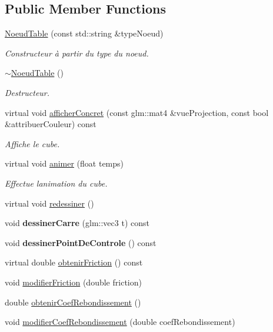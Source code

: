 \subsection*{Public Member Functions}
\begin{DoxyCompactItemize}
\item 
\hyperlink{group__inf2990_ga40983870720b331d17daeeb306e12ef5}{Noeud\+Table} (const std\+::string \&type\+Noeud)
\begin{DoxyCompactList}\small\item\em Constructeur à partir du type du noeud. \end{DoxyCompactList}\item 
\hyperlink{group__inf2990_ga6171c2df59de6f454f0d8c7915403ce7}{$\sim$\+Noeud\+Table} ()
\begin{DoxyCompactList}\small\item\em Destructeur. \end{DoxyCompactList}\item 
virtual void \hyperlink{group__inf2990_ga7e6bc962988899cf4ff7f2b1f9b51be9}{afficher\+Concret} (const glm\+::mat4 \&vue\+Projection, const bool \&attribuer\+Couleur) const
\begin{DoxyCompactList}\small\item\em Affiche le cube. \end{DoxyCompactList}\item 
virtual void \hyperlink{group__inf2990_gadf419e5147546815052d75529c4c45ab}{animer} (float temps)
\begin{DoxyCompactList}\small\item\em Effectue l\textquotesingle{}animation du cube. \end{DoxyCompactList}\item 
virtual void \hyperlink{group__inf2990_ga52e75d8d0ea0ac39c28b056245926f91}{redessiner} ()
\item 
void {\bfseries dessiner\+Carre} (glm\+::vec3 t) const
\item 
void {\bfseries dessiner\+Point\+De\+Controle} () const
\item 
virtual double \hyperlink{group__inf2990_ga0e66165b0be4a7994027c35201177903}{obtenir\+Friction} () const
\item 
void \hyperlink{group__inf2990_ga7e936cac741c4716548cb69ffde1777d}{modifier\+Friction} (double friction)
\item 
double \hyperlink{group__inf2990_ga6dd00515181d18b18cbc27292277b006}{obtenir\+Coef\+Rebondissement} ()
\item 
void \hyperlink{group__inf2990_ga3b11cdcbe4a4cf30095cd54083cd4019}{modifier\+Coef\+Rebondissement} (double coef\+Rebondissement)

\end{DoxyCompactItemize}
